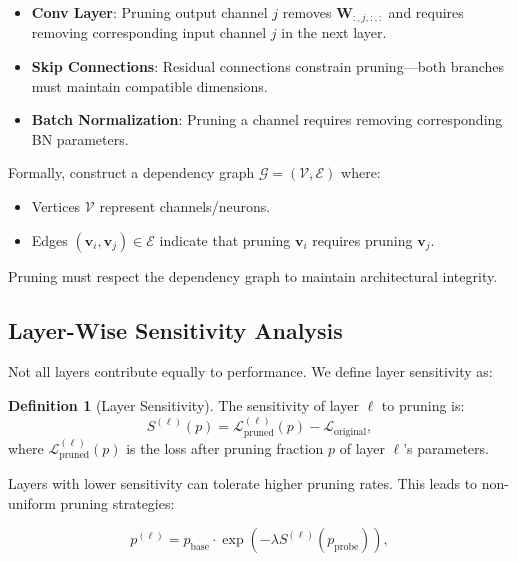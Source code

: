 \documentclass[12pt]{report}
\theoremstyle{definition}
\newtheorem{definition}[theorem]{Definition}
\newcommand{\loss}{\mathcal{L}}
\begin{document}
\begin{itemize}
\item \textbf{Conv Layer}: Pruning output channel $j$ removes $\mathbf{W}_{:,j,:,:}$ and requires removing corresponding input channel $j$ in the next layer.
\item \textbf{Skip Connections}: Residual connections constrain pruning—both branches must maintain compatible dimensions.
\item \textbf{Batch Normalization}: Pruning a channel requires removing corresponding BN parameters.
\end{itemize}

Formally, construct a dependency graph $\mathcal{G} = (\mathcal{V}, \mathcal{E})$ where:
\begin{itemize}
\item Vertices $\mathcal{V}$ represent channels/neurons.
\item Edges $(\mathbf{v}_i, \mathbf{v}_j) \in \mathcal{E}$ indicate that pruning $\mathbf{v}_i$ requires pruning $\mathbf{v}_j$.
\end{itemize}

Pruning must respect the dependency graph to maintain architectural integrity.

\subsection{Layer-Wise Sensitivity Analysis}

Not all layers contribute equally to performance. We define layer sensitivity as:

\begin{definition}[Layer Sensitivity]
The sensitivity of layer $\ell$ to pruning is:
\begin{equation}
S^{(\ell)}(p) = \loss_{\text{pruned}}^{(\ell)}(p) - \loss_{\text{original}},
\label{eq:layer_sensitivity}
\end{equation}
where $\loss_{\text{pruned}}^{(\ell)}(p)$ is the loss after pruning fraction $p$ of layer $\ell$'s parameters.
\end{definition}

Layers with lower sensitivity can tolerate higher pruning rates. This leads to non-uniform pruning strategies:

\begin{equation}
p^{(\ell)} = p_{\text{base}} \cdot \exp(-\lambda S^{(\ell)}(p_{\text{probe}})),
\label{eq:adaptive_pruning}
\end{equation}
\end{document}
